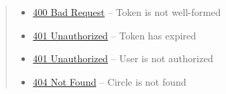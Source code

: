 \documentclass[letterpaper,10pt,english]{sphinxmanual}
\begin{document}
\begin{fulllineitems}
\begin{quote}
\begin{description}
\begin{itemize}
\item {} 
\href{http://www.w3.org/Protocols/rfc2616/rfc2616-sec10.html\#sec10.4.1}{400 Bad Request} -- Token is not well-formed

\item {} 
\href{http://www.w3.org/Protocols/rfc2616/rfc2616-sec10.html\#sec10.4.2}{401 Unauthorized} -- Token has expired

\item {} 
\href{http://www.w3.org/Protocols/rfc2616/rfc2616-sec10.html\#sec10.4.2}{401 Unauthorized} -- User is not authorized

\item {} 
\href{http://www.w3.org/Protocols/rfc2616/rfc2616-sec10.html\#sec10.4.5}{404 Not Found} -- Circle is not found

\end{itemize}

\end{description}\end{quote}

\end{fulllineitems}
\end{document}
